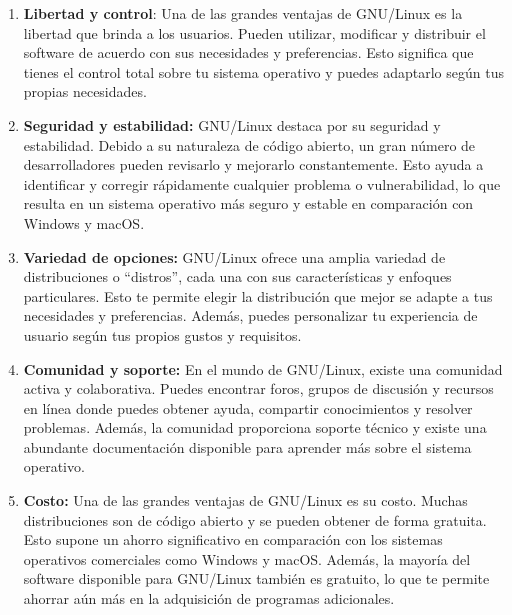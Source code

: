 \documentclass[
  letterpaper,
  DIV=11,
  numbers=noendperiod]{scrartcl}
\begin{document}
\begin{enumerate}
\def\labelenumi{\arabic{enumi}.}
\item
  \textbf{Libertad y control}: Una de las grandes ventajas de GNU/Linux
  es la libertad que brinda a los usuarios. Pueden utilizar, modificar y
  distribuir el software de acuerdo con sus necesidades y preferencias.
  Esto significa que tienes el control total sobre tu sistema operativo
  y puedes adaptarlo según tus propias necesidades.
\item
  \textbf{Seguridad y estabilidad:} GNU/Linux destaca por su seguridad y
  estabilidad. Debido a su naturaleza de código abierto, un gran número
  de desarrolladores pueden revisarlo y mejorarlo constantemente. Esto
  ayuda a identificar y corregir rápidamente cualquier problema o
  vulnerabilidad, lo que resulta en un sistema operativo más seguro y
  estable en comparación con Windows y macOS.
\item
  \textbf{Variedad de opciones:} GNU/Linux ofrece una amplia variedad de
  distribuciones o ``distros'', cada una con sus características y
  enfoques particulares. Esto te permite elegir la distribución que
  mejor se adapte a tus necesidades y preferencias. Además, puedes
  personalizar tu experiencia de usuario según tus propios gustos y
  requisitos.
\item
  \textbf{Comunidad y soporte:} En el mundo de GNU/Linux, existe una
  comunidad activa y colaborativa. Puedes encontrar foros, grupos de
  discusión y recursos en línea donde puedes obtener ayuda, compartir
  conocimientos y resolver problemas. Además, la comunidad proporciona
  soporte técnico y existe una abundante documentación disponible para
  aprender más sobre el sistema operativo.
\item
  \textbf{Costo:} Una de las grandes ventajas de GNU/Linux es su costo.
  Muchas distribuciones son de código abierto y se pueden obtener de
  forma gratuita. Esto supone un ahorro significativo en comparación con
  los sistemas operativos comerciales como Windows y macOS. Además, la
  mayoría del software disponible para GNU/Linux también es gratuito, lo
  que te permite ahorrar aún más en la adquisición de programas
  adicionales.
\end{enumerate}


\printbibliography
\end{document}
